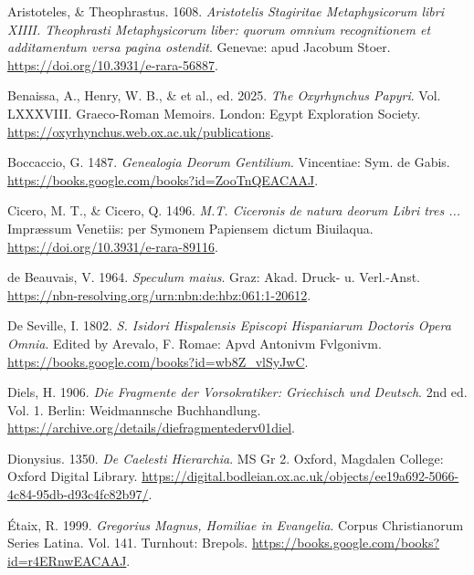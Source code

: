 \documentclass[
]{article}
\author{}
\date{}
\newlength{\cslhangindent}
\newlength{\cslentryspacingunit} %
\newenvironment{CSLReferences}[2] %
 {%
  \setlength{\parindent}{0pt}
  \ifodd #1
  \let\oldpar\par
  \def\par{\hangindent=\cslhangindent\oldpar}
  \fi
  \setlength{\parskip}{#2\cslentryspacingunit}
 }%
 {}
\begin{document}
\hypertarget{refs}{}
\begin{CSLReferences}{1}{0}
\leavevmode{}%
Aristoteles, \& Theophrastus. 1608. \emph{{Aristotelis Stagiritae
Metaphysicorum libri XIIII. Theophrasti Metaphysicorum liber: quorum
omnium recognitionem et additamentum versa pagina ostendit}}. {Genevae}:
apud Jacobum Stoer. \url{https://doi.org/10.3931/e-rara-56887}.

\leavevmode{}%
Benaissa, A., Henry, W. B., \& et al., ed. 2025. \emph{The Oxyrhynchus
Papyri}. Vol. LXXXVIII. Graeco-Roman Memoirs. London: Egypt Exploration
Society. \url{https://oxyrhynchus.web.ox.ac.uk/publications}.

\leavevmode{}%
Boccaccio, G. 1487. \emph{Genealogia Deorum Gentilium}. Vincentiae: Sym.
de Gabis. \url{https://books.google.com/books?id=ZooTnQEACAAJ}.

\leavevmode{}%
Cicero, M. T., \& Cicero, Q. 1496. \emph{{M.T. Ciceronis de natura
deorum Libri tres ...}} Impræssum Venetiis: per Symonem Papiensem dictum
Biuilaqua. \url{https://doi.org/10.3931/e-rara-89116}.

\leavevmode{}%
de Beauvais, V. 1964. \emph{{Speculum maius}}. Graz: {Akad. Druck- u.
Verl.-Anst.} \url{https://nbn-resolving.org/urn:nbn:de:hbz:061:1-20612}.

\leavevmode{}%
De Seville, I. 1802. \emph{S. Isidori Hispalensis Episcopi Hispaniarum
Doctoris Opera Omnia}. Edited by Arevalo, F. Romae: Apvd Antonivm
Fvlgonivm. \url{https://books.google.com/books?id=wb8Z_vlSyJwC}.

\leavevmode{}%
Diels, H. 1906. \emph{{Die Fragmente der Vorsokratiker}: {Griechisch und
Deutsch}}. 2nd ed. Vol. 1. Berlin: Weidmannsche Buchhandlung.
\url{https://archive.org/details/diefragmentederv01diel}.

\leavevmode{}%
Dionysius. 1350. \emph{De Caelesti Hierarchia}. MS Gr 2. Oxford,
Magdalen College: Oxford Digital Library.
\url{https://digital.bodleian.ox.ac.uk/objects/ee19a692-5066-4c84-95db-d93c4fc82b97/}.

\leavevmode{}%
Étaix, R. 1999. \emph{Gregorius Magnus, Homiliae in Evangelia}. Corpus
Christianorum Series Latina. Vol. 141. Turnhout: Brepols.
\url{https://books.google.com/books?id=r4ERnwEACAAJ}.


\end{CSLReferences}
\end{document}
